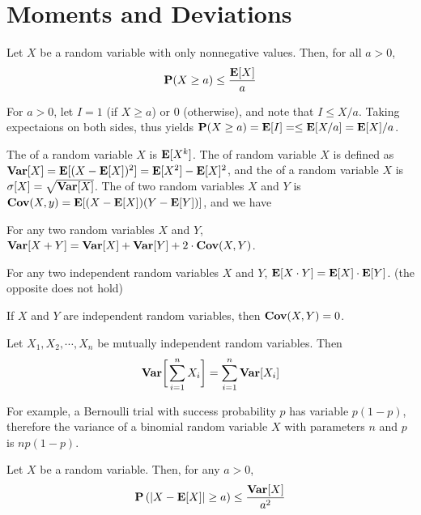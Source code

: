 \documentclass[main.tex]{subfiles}
\begin{document}
\minispacing

\section{Moments and Deviations}

\begin{theorem}
	Let $X$ be a random variable with only nonnegative values. Then, for all $a > 0$,
	\[
		\mathbf{P}(X \ge a) \le \frac{\mathbf{E}[X]}{a}
	\]
\end{theorem}

\begin{pf}
	For $a > 0$, let $I=1$ (if $X\ge a$) or $0$ (otherwise), and note that $I \le X / a$. Taking expectaions on both sides, thus yields $\mathbf{P}(X \ge a) = \mathbf{E}[I] = \le \mathbf{E}[X / a] = \mathbf{E}[X] / a$.
\end{pf}

The  of a random variable $X$ is $\mathbf{E}[X^k]$. The  of random variable $X$ is defined as $\mathbf{Var}[X]=\mathbf{E}[(X-\mathbf{E}[X])^2]=\mathbf{E}[X^2]-\mathbf{E}[X]^2$, and the  of a random variable $X$ is $\sigma[X]=\sqrt{\mathbf{Var}[X]}$. The  of two random variables $X$ and $Y$ is $\mathbf{Cov}(X,y)=\mathbf{E}[(X-\mathbf{E}[X])(Y-\mathbf{E}[Y])]$, and we have

\begin{lemma}
	For any two random variables $X$ and $Y$, $\mathbf{Var}[X+Y]=\mathbf{Var}[X]+\mathbf{Var}[Y]+2\cdot\mathbf{Cov}(X,Y)$.
\end{lemma}

\begin{lemma}
	For any two independent random variables $X$ and $Y$, $\mathbf{E}[X \cdot Y] = \mathbf{E}[X] \cdot \mathbf{E}[Y]$. (the opposite does not hold)
\end{lemma}

\begin{corollary}
	If $X$ and $Y$ are independent random variables, then $\mathbf{Cov}(X,Y)=0$.
\end{corollary}

\begin{theorem}
	Let $X_1,X_2,\cdots,X_n$ be mutually independent random variables. Then
	\[
		\mathbf{Var}\biggl[\;\!\sum_{i=1}^{n}X_i\biggr]=\sum_{i=1}^{n}\mathbf{Var}[X_i]
	\]
\end{theorem}

For example, a Bernoulli trial with success probability $p$ has variable $p(1-p)$, therefore the variance of a binomial random variable $X$ with parameters $n$ and $p$ is $np(1-p)$.

\begin{theorem}
	Let $X$ be a random variable. Then, for any $a > 0$,
	\[
		\mathbf{P}\left(\lvert X-\mathbf{E}[X]\rvert\ge a\right)\le \frac{\mathbf{Var}[X]}{a^2}
	\]
\end{theorem}
\end{document}
